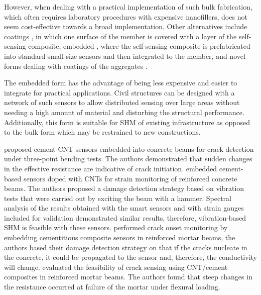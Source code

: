 \documentclass[twocolumn]{bmcart}%
\begin{document}
However, when dealing with a practical implementation of such bulk fabrication, which often requires laboratory procedures with expensive nanofillers, does not seem cost-effective towards a broad implementation. Other alternatives include coatings \cite{Downey2017, Downey2018e, Nespor2018a}, in which one surface of the member is covered with a layer of the self-sensing composite, embedded \cite{Meoni2018a, Saafi2009, DAlessandro2017}, where the self-sensing composite is prefabricated into standard small-size sensors and then integrated to the member, and novel forms dealing with coatings of the aggregates \cite{Han2015b, Gupta2017a, Loh2015a}.

The embedded form has the advantage of being less expensive and easier to integrate for practical applications. Civil structures can be designed with a network of such sensors to allow distributed sensing over large areas without needing a high amount of material and disturbing the structural performance. Additionally, this form is suitable for SHM of existing infrastructure as opposed to the bulk form which may be restrained to new constructions. 

\cite{Saafi2009} proposed cement-CNT sensors embedded into concrete beams for crack detection under three-point bending tests. The authors demonstrated that sudden changes in the effective resistance are indicative of crack initiation. \cite{DAlessandro2016b} embedded cement-based sensors doped with CNTs for strain monitoring of reinforced concrete beams. The authors proposed a damage detection strategy based on vibration tests that were carried out by exciting the beam with a hammer. Spectral analysis of the results obtained with the smart sensors and with strain gauges included for validation demonstrated similar results, therefore, vibration-based SHM is feasible with these sensors. \cite{Lim2017} performed crack onset monitoring by embedding  cementitious composite sensors in reinforced mortar beams, the authors based their damage detection strategy on that if the cracks nucleate in the concrete, it could be propagated to the sensor and, therefore, the conductivity will change. \cite{Naeem2017a} evaluated the feasibility of crack sensing using CNT/cement composites in reinforced mortar beams. The authors found that steep changes in the resistance occurred at failure of the mortar under flexural loading. 
\end{document}
